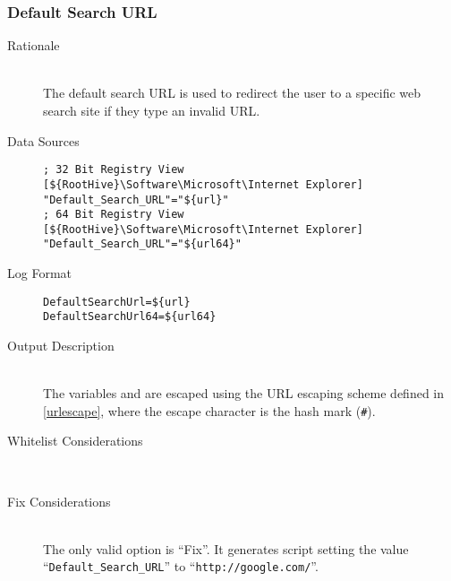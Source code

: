 \subsubsection{Default Search URL}
\begin{description}
\item[Rationale]  \hfill \\ The default search URL is used to redirect the user
to a specific web search site if they type an invalid URL.

\item[Data Sources] \hfill
\vspace{-\baselineskip}
\begin{verbatim}
; 32 Bit Registry View
[${RootHive}\Software\Microsoft\Internet Explorer]
"Default_Search_URL"="${url}"
; 64 Bit Registry View
[${RootHive}\Software\Microsoft\Internet Explorer]
"Default_Search_URL"="${url64}"
\end{verbatim}
\item[Log Format] \hfill
\vspace{-\baselineskip}
\begin{verbatim} 
DefaultSearchUrl=${url}
DefaultSearchUrl64=${url64}
\end{verbatim}
\item[Output Description] \hfill \\
The variables  and  are escaped using the URL escaping
scheme defined in \ref{urlescape}, where the escape character is the hash mark
(\verb|#|).
\item[Whitelist Considerations] \hfill \\

\item[Fix Considerations] \hfill \\
The only valid option is ``Fix''. It generates script setting the value
``\verb|Default_Search_URL|'' to ``\verb|http://google.com/|''.
\end{description}

